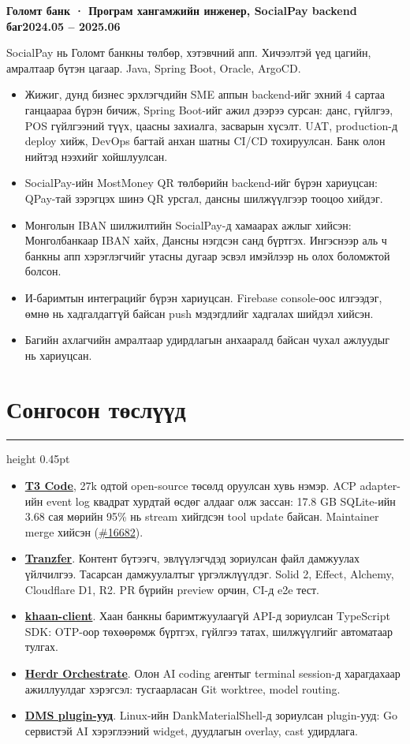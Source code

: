 \documentclass[9.5pt,letterpaper]{article}
\newcommand{\cvsection}[1]{\section*{#1}\vspace{3pt}\hrule height 0.45pt\vspace{3pt}}
\newcommand{\dated}[2]{#1\hfill#2\par}
\begin{document}
\dated{\textbf{Голомт банк · Програм хангамжийн инженер, SocialPay backend баг}}{\textbf{2024.05 – 2025.06}}
SocialPay нь Голомт банкны төлбөр, хэтэвчний апп. Хичээлтэй үед цагийн, амралтаар бүтэн цагаар. Java, Spring Boot, Oracle, ArgoCD.
\begin{itemize}
  \item Жижиг, дунд бизнес эрхлэгчдийн SME аппын backend-ийг эхний 4 сартаа ганцаараа бүрэн бичиж, Spring Boot-ийг ажил дээрээ сурсан: данс, гүйлгээ, POS гүйлгээний түүх, цаасны захиалга, засварын хүсэлт. UAT, production-д deploy хийж, DevOps багтай анхан шатны CI/CD тохируулсан. Банк олон нийтэд нээхийг хойшлуулсан.
  \item SocialPay-ийн MostMoney QR төлбөрийн backend-ийг бүрэн хариуцсан: QPay-тай зэрэгцэх шинэ QR урсгал, дансны шилжүүлгээр тооцоо хийдэг.
  \item Монголын IBAN шилжилтийн SocialPay-д хамаарах ажлыг хийсэн: Монголбанкаар IBAN хайх, Дансны нэгдсэн санд бүртгэх. Ингэснээр аль ч банкны апп хэрэглэгчийг утасны дугаар эсвэл имэйлээр нь олох боломжтой болсон.
  \item И-баримтын интеграцийг бүрэн хариуцсан. Firebase console-оос илгээдэг, өмнө нь хадгалдаггүй байсан push мэдэгдлийг хадгалах шийдэл хийсэн.
  \item Багийн ахлагчийн амралтаар удирдлагын анхааралд байсан чухал ажлуудыг нь хариуцсан.
\end{itemize}

\cvsection{Сонгосон төслүүд}
\begin{itemize}
  \item \href{https://github.com/pingdotgg/t3code}{\textcolor{linkblue}{\textbf{T3 Code}}}, 27k одтой open-source төсөлд оруулсан хувь нэмэр. ACP adapter-ийн event log квадрат хурдтай өсдөг алдааг олж зассан: 17.8 GB SQLite-ийн 3.68 сая мөрийн 95\% нь stream хийгдсэн tool update байсан. Maintainer merge хийсэн (\href{https://github.com/pingdotgg/t3code/pull/16682}{\textcolor{linkblue}{\#16682}}).
  \item \href{https://github.com/darjss/tranzfer-v2}{\textcolor{linkblue}{\textbf{Tranzfer}}}. Контент бүтээгч, эвлүүлэгчдэд зориулсан файл дамжуулах үйлчилгээ. Тасарсан дамжуулалтыг үргэлжлүүлдэг. Solid 2, Effect, Alchemy, Cloudflare D1, R2. PR бүрийн preview орчин, CI-д e2e тест.
  \item \href{https://github.com/darjss/khaan-client}{\textcolor{linkblue}{\textbf{khaan-client}}}. Хаан банкны баримтжуулаагүй API-д зориулсан TypeScript SDK: OTP-оор төхөөрөмж бүртгэх, гүйлгээ татах, шилжүүлгийг автоматаар тулгах.
  \item \href{https://github.com/darjss/herdr-orchestrate}{\textcolor{linkblue}{\textbf{Herdr Orchestrate}}}. Олон AI coding агентыг terminal session-д харагдахаар ажиллуулдаг хэрэгсэл: тусгаарласан Git worktree, model routing.
  \item \href{https://github.com/darjss/dms-bar-usage}{\textcolor{linkblue}{\textbf{DMS plugin-ууд}}}. Linux-ийн DankMaterialShell-д зориулсан plugin-ууд: Go сервистэй AI хэрэглээний widget, дуудлагын overlay, cast удирдлага.
\end{itemize}
\end{document}
